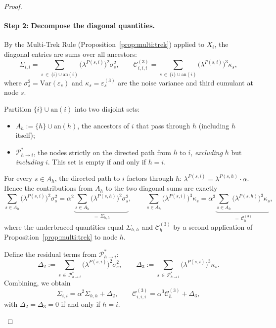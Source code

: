 \documentclass[11pt,a4paper]{article}
\numberwithin{equation}{section}
\begin{document}
\begin{proof}
\begin{enumerate}[label=(\arabic*)]
\paragraph{Step 2: Decompose the diagonal quantities.}
By the Multi-Trek Rule (Proposition~\ref{prop:multi:trek}) applied to $X_i$,
the diagonal entries are sums over all ancestors:
\[
  \Sigma_{i,i}
  = \sum_{s\,\in\,\{i\}\cup\mathrm{an}(i)}
      \bigl(\lambda^{P(s,i)}\bigr)^{2}\sigma_{s}^{2},
  \qquad
  \mathcal{C}^{(3)}_{i,i,i}
  = \sum_{s\,\in\,\{i\}\cup\mathrm{an}(i)}
      \bigl(\lambda^{P(s,i)}\bigr)^{3}\kappa_{s},
\]
where $\sigma_s^2 = \mathrm{Var}(\varepsilon_s)$ and
$\kappa_s = \varepsilon^{(3)}_s$ are the noise variance and third cumulant
at node $s$.

Partition $\{i\}\cup\mathrm{an}(i)$ into two disjoint sets:
\begin{itemize}
  \item $A_h := \{h\} \cup \mathrm{an}(h)$, the ancestors of $i$ that
    pass through $h$ (including $h$ itself);
  \item $\mathcal{P}^{*}_{h \to i}$, the nodes strictly on the directed
    path from $h$ to $i$, \emph{excluding} $h$ but \emph{including} $i$.
    This set is empty if and only if $h = i$.
\end{itemize}

For every $s\in A_h$, the directed path to $i$ factors through $h$:
$\lambda^{P(s,i)} = \lambda^{P(s,h)}\cdot\alpha$.  Hence the contributions
from $A_h$ to the two diagonal sums are exactly
\[
  \sum_{s\in A_h}\bigl(\lambda^{P(s,i)}\bigr)^{2}\sigma_s^2
  = \alpha^2\underbrace{\sum_{s\in A_h}\bigl(\lambda^{P(s,h)}\bigr)^{2}
    \sigma_s^2}_{=\,\Sigma_{h,h}},
  \qquad
  \sum_{s\in A_h}\bigl(\lambda^{P(s,i)}\bigr)^{3}\kappa_s
  = \alpha^3\underbrace{\sum_{s\in A_h}\bigl(\lambda^{P(s,h)}\bigr)^{3}
    \kappa_s}_{=\,\mathcal{C}^{(3)}_{h}},
\]
where the underbraced quantities equal $\Sigma_{h,h}$ and
$\mathcal{C}^{(3)}_{h}$ by a second application of
Proposition~\ref{prop:multi:trek} to node $h$.

Define the residual terms from $\mathcal{P}^{*}_{h\to i}$:
\[
  \Delta_{2}
  := \sum_{s\,\in\,\mathcal{P}^{*}_{h\to i}}
     \bigl(\lambda^{P(s,i)}\bigr)^{2}\sigma_{s}^{2},
  \qquad
  \Delta_{3}
  := \sum_{s\,\in\,\mathcal{P}^{*}_{h\to i}}
     \bigl(\lambda^{P(s,i)}\bigr)^{3}\kappa_{s}.
\]
Combining, we obtain
\begin{equation}\label{eq:diag_decomp}
  \Sigma_{i,i} = \alpha^{2}\Sigma_{h,h} + \Delta_{2},
  \qquad
  \mathcal{C}^{(3)}_{i,i,i} = \alpha^{3}\mathcal{C}^{(3)}_{h} + \Delta_{3},
\end{equation}
with $\Delta_2 = \Delta_3 = 0$ if and only if $h = i$.


\end{enumerate}
\end{proof}
\end{document}
